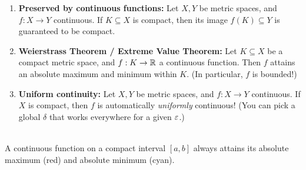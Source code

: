 \begin{enumerate}
    \item \textbf{Preserved by continuous functions:} 
    Let $X, Y$ be metric spaces, and $f: X \to Y$ continuous. If $K \subseteq X$ is compact, then its image $f(K) \subseteq Y$ is guaranteed to be compact.
    
    \item \textbf{Weierstrass Theorem / Extreme Value Theorem:}
    Let $K \subseteq X$ be a compact metric space, and $f: K \to \mathbb{R}$ a continuous function. Then $f$ attains an absolute maximum and minimum within $K$. \textcolor{eGray}{(In particular, $f$ is bounded!)}
    
    \item \textbf{Uniform continuity:}
    Let $X, Y$ be metric spaces, and $f: X \to Y$ continuous. If $X$ is compact, then $f$ is automatically \emph{uniformly} continuous! \textcolor{eGray}{(You can pick a global $\delta$ that works everywhere for a given $\varepsilon$.)}
\end{enumerate}

\begin{center}
\\
\textcolor{eGray}{A continuous function on a compact interval $[a,b]$ always attains its absolute maximum (red) and absolute minimum (cyan).}
\end{center}


